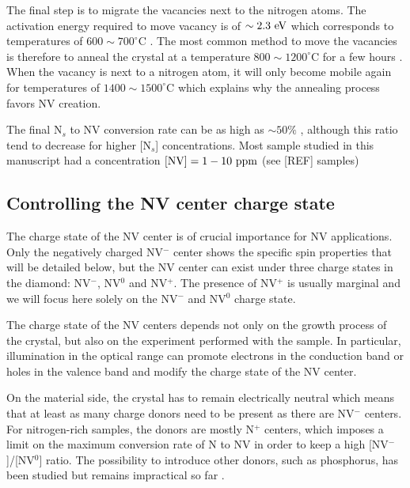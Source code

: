 \documentclass[a4paper, 11pt]{book}
\begin{document}
The final step is to migrate the vacancies next to the nitrogen atoms. The activation energy required to move vacancy is of $\sim 2.3\ \rm eV$ which corresponds to temperatures of $600\sim 700 ^\circ$C \citep{davies1992vacancy, newton2002recombination}. The most common method to move the vacancies is therefore to anneal the crystal at a temperature $800 \sim 1200 ^\circ$C for a few hours \citep{botsoa2011optimal}. When the vacancy is next to a nitrogen atom, it will only become mobile again for temperatures of $1400 \sim 1500 ^\circ$C \citep{zaitsev2013optical, pinto2012diffusion} which explains why the annealing process favors NV creation.

The final N$_s$ to NV conversion rate can be as high as $\sim 50 \%$ \citep{grezes2015storage, hartland2014study}, although this ratio tend to decrease for higher [N$_s$] concentrations. Most sample studied in this manuscript had a concentration $[\rm NV]= 1-10\ \rm ppm$ (see [REF] samples)

\subsection{Controlling the NV center charge state}

The charge state of the NV center is of crucial importance for NV applications. Only the negatively charged NV$^-$ center shows the specific spin properties that will be detailed below, but the NV center can exist under three charge states in the diamond: NV$^-$, NV$^0$ and NV$^+$. The presence of NV$^+$ is usually marginal \citep{hauf2014addressing, pfender2017protecting} and we will focus here solely on the NV$^-$ and NV$^0$ charge state.

The charge state of the NV centers depends not only on the growth process of the crystal, but also on the experiment performed with the sample. In particular, illumination in the optical range can promote electrons in the conduction band or holes in the valence band and modify the charge state of the NV center.

On the material side, the crystal has to remain electrically neutral which means that at least as many charge donors need to be present as there are NV$^-$ centers. For nitrogen-rich samples, the donors are mostly N$^+$ centers, which imposes a limit on the maximum conversion rate of N to NV in order to keep a high [NV$^-$]/[NV$^0$] ratio. The possibility to introduce other donors, such as phosphorus, has been studied \citep{doi2016pure} but remains impractical so far \citep{barry2020sensitivity}.
\end{document}
